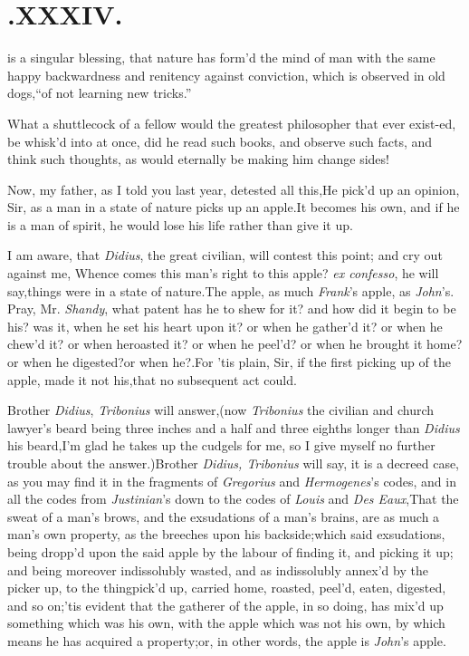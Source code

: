 \documentclass{article}
\begin{document}
\section{.\quad  XXXIV.}

 is a singular blessing, that
nature has form’d the mind of man with the same happy
backwardness and renitency against conviction, which is observed in
old dogs,\tsk “of not learning new tricks.”

What a shuttlecock of a fellow would the greatest philosopher
that ever exist-\break ed, be whisk’d into at once, did he read
such books, and observe such facts, and think such thoughts, as
would eternally be making him change sides!

Now, my father, as I told you last year, detested all
this,\tsk He pick’d up an opinion, Sir, as a man in a state
of nature picks up an apple.\tsk It becomes his own,\tsk\break
and if he is a man of spirit, he would lose his life rather than
give it up.\tsh

I am aware, that \textit{Didius}, the great civilian, will contest
this point; and cry out against me, Whence comes this man’s
right to this apple? \textit{ex confesso}, he will say,\tsh things
were in a state of nature.\break\tsk The apple, as much
\textit{Frank}’s apple, as \textit{John}’s. Pray, Mr.
\textit{Shandy}, what patent has he to shew for it? and how did it
begin to be his? was it, when he set
his heart upon it? or when he gather’d it? or when he chew’d it?
or when he\break roasted it? or when he peel’d? or when he brought it
home? or when he digest\-ed?\tsh or when he\tsh\tsk ?\tsh.\break For ’tis
plain, Sir, if the first picking up of the apple, made it not
his,\tsh that no\break
subsequent act could.

Brother \textit{Didius}, \textit{Tribonius} will answer,\tsk (now
\textit{Tribonius} the civilian and church lawyer’s beard being
three inches and a half and three eighths longer than \textit{Didius}
his beard,\tsk I’m glad he takes up the cudgels for me, so I
give myself no further trouble about the answer.)\tsk Brother
\textit{Didius, Tribonius} will say, it is a decreed case, as you may
find it in the fragments of \textit{Gregorius} and
\textit{Hermogenes}’s codes, and in all the codes from
\textit{Justinian}’s down to the codes of \textit{Louis} and
\textit{Des Eaux},\tsk That the sweat of a man’s brows, and
the exsudations of a man’s brains, are as much a man’s
own property, as the breeches upon his backside;\tsk which said
exsudations, \etc\@ being dropp’d upon the said apple by the
labour of finding it, and picking it up; and being moreover
indissolubly wasted, and as indissolubly annex’d by the
picker up, to the thing\break pick’d up, carried home, roasted,
peel’d, eaten, digested, and so on;\tsh ’tis
evi\-dent that the gatherer of the apple, in so doing, has
mix’d up something which was his own, with the apple which
was not his own, by which means he has acquired a
property;\tsk or, in other words, the apple is
\textit{John}’s apple.
\end{document}
